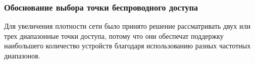 


\subsubsection{Обоснование выбора точки беспроводного доступа}

Для увеличения плотности сети было принято решение рассматривать двух или трех диапазонные точки доступа, потому что они обеспечат поддержку наибольшего количество устройств благодаря использованию разных частотных диапазонов.

